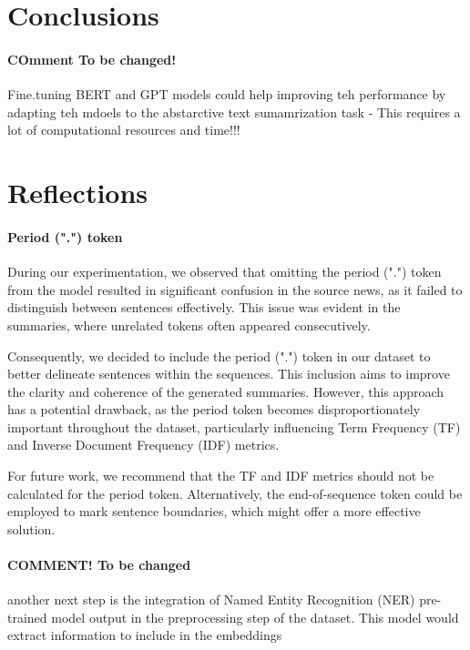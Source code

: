 \section{Conclusions}
\paragraph{COmment To be changed!}Fine.tuning BERT and GPT models could help improving teh performance by adapting teh mdoels to the abstarctive text sumamrization task - This requires a lot of computational resources and time!!!

\section{Reflections}
\paragraph{Period (".") token}
During our experimentation, we observed that omitting the period (".") token from the model resulted in significant confusion in the source news, as it failed to distinguish between sentences effectively. This issue was evident in the summaries, where unrelated tokens often appeared consecutively.

Consequently, we decided to include the period (".") token in our dataset to better delineate sentences within the sequences. This inclusion aims to improve the clarity and coherence of the generated summaries. However, this approach has a potential drawback, as the period token becomes disproportionately important throughout the dataset, particularly influencing Term Frequency (TF) and Inverse Document Frequency (IDF) metrics.

For future work, we recommend that the TF and IDF metrics should not be calculated for the period token. Alternatively, the end-of-sequence token could be employed to mark sentence boundaries, which might offer a more effective solution.

\paragraph{COMMENT! To be changed}another next step is the integration of Named Entity Recognition (NER) pre-trained model output in the preprocessing step of the dataset. This model would extract information  to include in the embeddings  


